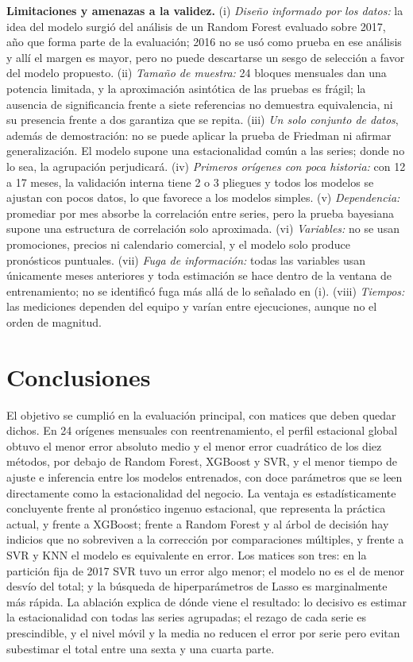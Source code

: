 \documentclass[pdflatex,sn-mathphys-num]{sn-jnl}
\begin{document}
\textbf{Limitaciones y amenazas a la validez.} (i) \emph{Diseño informado por los datos:} la idea del modelo surgió del análisis de un Random Forest evaluado sobre 2017, año que forma parte de la evaluación; 2016 no se usó como prueba en ese análisis y allí el margen es mayor, pero no puede descartarse un sesgo de selección a favor del modelo propuesto. (ii) \emph{Tamaño de muestra:} 24 bloques mensuales dan una potencia limitada, y la aproximación asintótica de las pruebas es frágil; la ausencia de significancia frente a siete referencias no demuestra equivalencia, ni su presencia frente a dos garantiza que se repita. (iii) \emph{Un solo conjunto de datos}, además de demostración: no se puede aplicar la prueba de Friedman ni afirmar generalización. El modelo supone una estacionalidad común a las series; donde no lo sea, la agrupación perjudicará. (iv) \emph{Primeros orígenes con poca historia:} con 12 a 17 meses, la validación interna tiene 2 o 3 pliegues y todos los modelos se ajustan con pocos datos, lo que favorece a los modelos simples. (v) \emph{Dependencia:} promediar por mes absorbe la correlación entre series, pero la prueba bayesiana supone una estructura de correlación solo aproximada. (vi) \emph{Variables:} no se usan promociones, precios ni calendario comercial, y el modelo solo produce pronósticos puntuales. (vii) \emph{Fuga de información:} todas las variables usan únicamente meses anteriores y toda estimación se hace dentro de la ventana de entrenamiento; no se identificó fuga más allá de lo señalado en (i). (viii) \emph{Tiempos:} las mediciones dependen del equipo y varían entre ejecuciones, aunque no el orden de magnitud.

\section{Conclusiones}\label{sec:conclusiones}

El objetivo se cumplió en la evaluación principal, con matices que deben quedar dichos. En 24 orígenes mensuales con reentrenamiento, el perfil estacional global obtuvo el menor error absoluto medio y el menor error cuadrático de los diez métodos, por debajo de Random Forest, XGBoost y SVR, y el menor tiempo de ajuste e inferencia entre los modelos entrenados, con doce parámetros que se leen directamente como la estacionalidad del negocio. La ventaja es estadísticamente concluyente frente al pronóstico ingenuo estacional, que representa la práctica actual, y frente a XGBoost; frente a Random Forest y al árbol de decisión hay indicios que no sobreviven a la corrección por comparaciones múltiples, y frente a SVR y KNN el modelo es equivalente en error. Los matices son tres: en la partición fija de 2017 SVR tuvo un error algo menor; el modelo no es el de menor desvío del total; y la búsqueda de hiperparámetros de Lasso es marginalmente más rápida. La ablación explica de dónde viene el resultado: lo decisivo es estimar la estacionalidad con todas las series agrupadas; el rezago de cada serie es prescindible, y el nivel móvil y la media no reducen el error por serie pero evitan subestimar el total entre una sexta y una cuarta parte.
\end{document}
